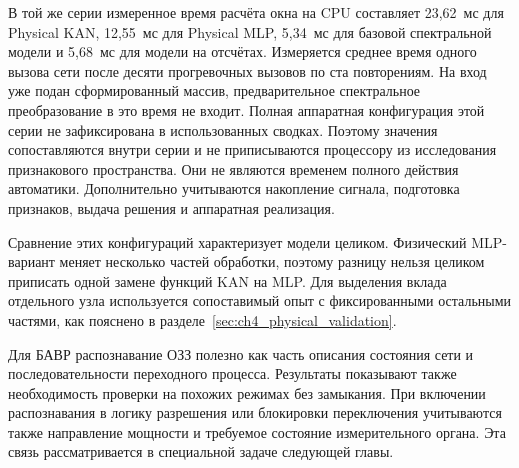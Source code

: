 {}

В той же серии измеренное время расчёта окна на CPU
составляет 23,62~мс для Physical KAN,
12,55~мс для Physical MLP,
5,34~мс для базовой спектральной модели
и 5,68~мс для модели на отсчётах.
Измеряется среднее время одного вызова сети
после десяти прогревочных вызовов по ста повторениям.
На вход уже подан сформированный массив,
предварительное спектральное преобразование в это время не входит.
Полная аппаратная конфигурация этой серии не зафиксирована
в использованных сводках. Поэтому значения сопоставляются
внутри серии и не приписываются процессору из исследования
признакового пространства.
Они не являются временем полного действия автоматики.
Дополнительно учитываются накопление сигнала,
подготовка признаков, выдача решения
и аппаратная реализация.

Сравнение этих конфигураций характеризует модели целиком.
Физический MLP-вариант меняет несколько частей обработки,
поэтому разницу нельзя целиком приписать
одной замене функций KAN на MLP.
Для выделения вклада отдельного узла используется
сопоставимый опыт с фиксированными остальными частями,
как пояснено в разделе~\ref{sec:ch4_physical_validation}.

Для БАВР распознавание ОЗЗ полезно как часть описания
состояния сети и последовательности переходного процесса.
Результаты показывают также необходимость проверки
на похожих режимах без замыкания.
При включении распознавания в логику разрешения
или блокировки переключения учитываются также направление
мощности и требуемое состояние измерительного органа.
Эта связь рассматривается в специальной задаче следующей главы.
